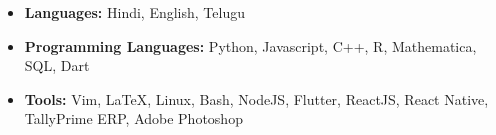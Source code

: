 \begin{itemize}
    \item \textbf{Languages:} Hindi, English, Telugu
    \item \textbf{Programming Languages:} Python, Javascript, C++, R, Mathematica, SQL, Dart
    \item \textbf{Tools:} Vim, \LaTeX, Linux, Bash, NodeJS, Flutter, ReactJS, React Native, TallyPrime ERP, Adobe Photoshop 
\end{itemize}